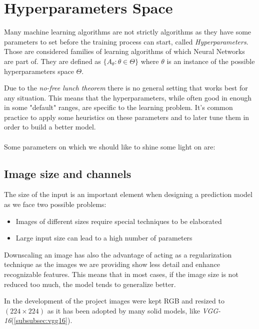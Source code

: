 \newpage


\section{Hyperparameters Space}
\label{sec:hyperparameters-space}
Many machine learning algorithms are not strictly algorithms as they have some parameters to
set before the training process can start, called \textit{Hyperparameters}.
Those are considered families of learning algorithms of which Neural Networks are part of.
They are defined as  $\{A_\theta : \theta \in \Theta\}$ where $\theta$ is an instance of the possible hyperparameters space $\Theta$.

Due to the \textit{no-free lunch theorem} there is no general setting that works best for any situation.
This means that the hyperparameters, while often good in enough in some "default" ranges, are specific to the learning problem.
It's common practice to apply some heuristics on these parameters and to later tune them in order to build a better model.


\paragraph{}
Some parameters on which we should like to shine some light on are:

\subsection{Image size and channels}
\label{subsec:image-size-and-channels}
The size of the input is an important element when designing a prediction model as we face two possible problems:
\begin{itemize}
    \item Images of different sizes require special techniques to be elaborated
    \item Large input size can lead to a high number of parameters
\end{itemize}

Downscaling an image has also the advantage of acting as a regularization technique as the images we are providing
show less detail and enhance recognizable features.
This means that in most cases, if the image size is not reduced too much, the model tends to generalize better.

In the development of the project images were kept RGB and resized to $(224 \times 224)$ as it has been adopted by many
solid models, like \textit{VGG-16}(\ref{subsubsec:vgg16}).

